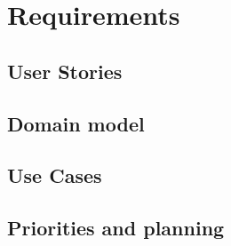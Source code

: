 \chapter{Requirements}

\section{User Stories}


\section{Domain model}


\section{Use Cases}

















\section{Priorities and planning}\label{sec:prio_and_planning}




